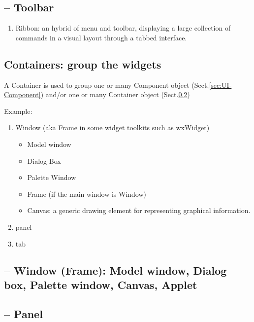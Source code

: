 \subsection{-- Toolbar}

\begin{enumerate}
  \item Ribbon: an hybrid of menu and toolbar, displaying a large collection of
  commands in a visual layout through a tabbed interface.
\end{enumerate}


\subsection{Containers: group the widgets}
\label{sec:UI-Container}

A Container is used to group one or many Component object
(Sect.\ref{sec:UI-Component}) and/or one or many Container object
(Sect.\ref{sec:UI-Container})

Example:
\begin{enumerate}
  \item Window (aka Frame in some widget toolkits such as wxWidget)
  
  \begin{itemize}
    \item Model window
    \item Dialog Box
    \item Palette Window
    \item Frame (if the main window is Window)
    \item Canvas: a generic drawing element for representing graphical
    information.
  \end{itemize}
  
  
  \item panel
  
  \item tab
  
\end{enumerate}

\subsection{-- Window (Frame): Model window, Dialog box, Palette window,
Canvas, Applet}

\subsection{-- Panel}

